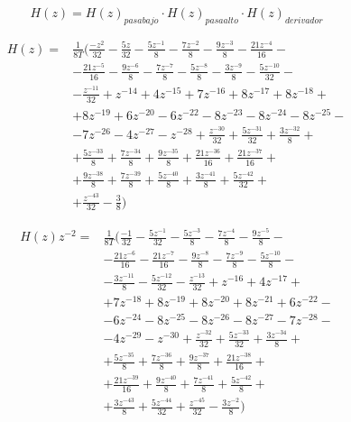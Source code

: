 \documentclass[%
        final,
        notitlepage,
        narroweqnarray,
        inline,
        ]{ieee}
\numberwithin{equation}{section}
\numberwithin{figure}{section}
\numberwithin{table}{section}
\begin{document}
\begin{equation}
H(z) =  H(z)_{pasabajo}\cdot H(z)_{pasaalto} \cdot H(z)_{derivador}
\end{equation}

\begin{equation}
\begin{split}
H(z) = & \frac{1}{8T}(\frac{-z^2}{32}-\frac{5z}{32}-\frac{5z^{-1}}{8}-\frac{7z^{-2}}{8}-\frac{9z^{-3}}{8}-\frac{21z^{-4}}{16}-\\
&-\frac{21z^{-5}}{16}-\frac{9z^{-6}}{8}-\frac{7z^{-7}}{8}-\frac{5z^{-8}}{8}-\frac{3z^{-9}}{8}-\frac{5z^{-10}}{32}-\\
&-\frac{z^{-11}}{32}+z^{-14}+4z^{-15}+7z^{-16}+8z^{-17}+8z^{-18}+\\
&+8z^{-19}+6z^{-20}-6z^{-22}-8z^{-23}-8z^{-24}-8z^{-25}-\\
&-7z^{-26}-4z^{-27}-z^{-28}+\frac{z^{-30}}{32}+\frac{5z^{-31}}{32}+\frac{3z^{-32}}{8}+\\
&+\frac{5z^{-33}}{8}+\frac{7z^{-34}}{8}+\frac{9z^{-35}}{8}+\frac{21z^{-36}}{16}+\frac{21z^{-37}}{16}+\\
&+\frac{9z^{-38}}{8}+\frac{7z^{-39}}{8}+\frac{5z^{-40}}{8}+\frac{3z^{-41}}{8}+\frac{5z^{-42}}{32}+\\
&+\frac{z^{-43}}{32}-\frac{3}{8})
\end{split}
\end{equation}

\begin{equation}
\begin{split}
H(z) z^{-2}= & \frac{1}{8T}(\frac{-1}{32}-\frac{5z^{-1}}{32}-\frac{5z^{-3}}{8}-\frac{7z^{-4}}{8}-\frac{9z^{-5}}{8}-\\
&-\frac{21z^{-6}}{16}-\frac{21z^{-7}}{16}-\frac{9z^{-8}}{8}-\frac{7z^{-9}}{8}-\frac{5z^{-10}}{8}-\\
&-\frac{3z^{-11}}{8}-\frac{5z^{-12}}{32}-\frac{z^{-13}}{32}+z^{-16}+4z^{-17}+\\
&+7z^{-18}+8z^{-19}+8z^{-20}+8z^{-21}+6z^{-22}-\\
&-6z^{-24}-8z^{-25}-8z^{-26}-8z^{-27}-7z^{-28}-\\
&-4z^{-29}-z^{-30}+\frac{z^{-32}}{32}+\frac{5z^{-33}}{32}+\frac{3z^{-34}}{8}+\\
&+\frac{5z^{-35}}{8}+\frac{7z^{-36}}{8}+\frac{9z^{-37}}{8}+\frac{21z^{-38}}{16}+\\
&+\frac{21z^{-39}}{16}+\frac{9z^{-40}}{8}+\frac{7z^{-41}}{8}+\frac{5z^{-42}}{8}+\\
&+\frac{3z^{-43}}{8}+\frac{5z^{-44}}{32}+\frac{z^{-45}}{32}-\frac{3z^{-2}}{8})
\end{split}
\end{equation}
\end{document}
